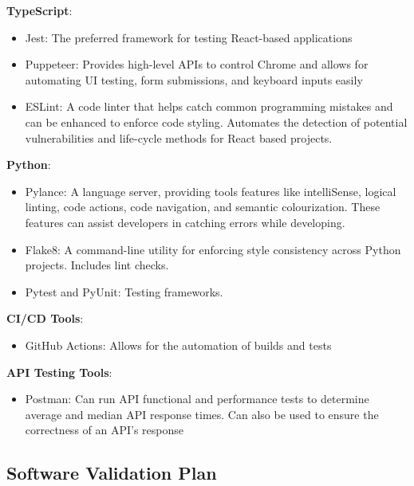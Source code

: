 \documentclass[12pt, titlepage]{article}
\begin{document}
  \textbf{TypeScript}:
   \begin{itemize}
   \item Jest: The preferred framework for testing React-based applications
   \item Puppeteer: Provides high-level APIs to control Chrome and allows for automating UI testing, form submissions, and keyboard inputs easily
   \item ESLint: A code linter that helps catch common programming mistakes and can be enhanced to enforce code styling. Automates the detection of potential vulnerabilities and life-cycle methods for React based projects.
   \end{itemize}
   \textbf{Python}:
   \begin{itemize}
   \item Pylance: A language server, providing tools features like intelliSense, logical linting, code actions, code navigation, and semantic colourization. These features can assist developers in catching errors while developing.
   \item Flake8: A command-line utility for enforcing style consistency across Python projects. Includes lint checks.
   \item Pytest and PyUnit: Testing frameworks.
   \end{itemize}
  \textbf{CI/CD Tools}:
  \begin{itemize}
  \item GitHub Actions: Allows for the automation of builds and tests
  \end{itemize}
    \textbf{API Testing Tools}:
  \begin{itemize}
  \item Postman: Can run API functional and performance tests to determine average and median API response times. Can also be used to ensure the correctness of an API's response 
  \end{itemize}

\subsection{Software Validation Plan}


\end{document}
